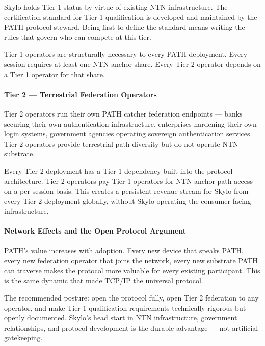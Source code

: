 \documentclass[
  11pt,
]{article}
\begin{document}
Skylo holds Tier 1 status by virtue of existing NTN infrastructure. The
certification standard for Tier 1 qualification is developed and
maintained by the PATH protocol steward. Being first to define the
standard means writing the rules that govern who can compete at this
tier.

Tier 1 operators are structurally necessary to every PATH deployment.
Every session requires at least one NTN anchor share. Every Tier 2
operator depends on a Tier 1 operator for that share.

\hypertarget{tier-2-terrestrial-federation-operators}{%
\paragraph{Tier 2 --- Terrestrial Federation
Operators}\label{tier-2-terrestrial-federation-operators}}

Tier 2 operators run their own PATH catcher federation endpoints ---
banks securing their own authentication infrastructure, enterprises
hardening their own login systems, government agencies operating
sovereign authentication services. Tier 2 operators provide terrestrial
path diversity but do not operate NTN substrate.

Every Tier 2 deployment has a Tier 1 dependency built into the protocol
architecture. Tier 2 operators pay Tier 1 operators for NTN anchor path
access on a per-session basis. This creates a persistent revenue stream
for Skylo from every Tier 2 deployment globally, without Skylo operating
the consumer-facing infrastructure.

\hypertarget{network-effects-and-the-open-protocol-argument}{%
\paragraph{Network Effects and the Open Protocol
Argument}\label{network-effects-and-the-open-protocol-argument}}

PATH's value increases with adoption. Every new device that speaks PATH,
every new federation operator that joins the network, every new
substrate PATH can traverse makes the protocol more valuable for every
existing participant. This is the same dynamic that made TCP/IP the
universal protocol.

The recommended posture: open the protocol fully, open Tier 2 federation
to any operator, and make Tier 1 qualification requirements technically
rigorous but openly documented. Skylo's head start in NTN
infrastructure, government relationships, and protocol development is
the durable advantage --- not artificial gatekeeping.
\end{document}
